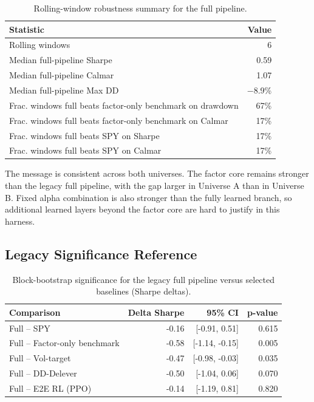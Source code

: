 \documentclass[10pt,twocolumn]{article}
\begin{document}
\begin{table}[t]
\centering
\caption{Rolling-window robustness summary for the full pipeline.}
\label{tab:robustness_summary}
\begingroup\small
\begin{tabular}{@{} >{\raggedright\arraybackslash}p{} r @{}}
\toprule
\textbf{Statistic} & \textbf{Value} \\
\midrule
Rolling windows                                    & 6 \\
Median full-pipeline Sharpe                        & 0.59 \\
Median full-pipeline Calmar                        & 1.07 \\
Median full-pipeline Max DD                        & $-$8.9\% \\
Frac. windows full beats factor-only benchmark on drawdown & 67\% \\
Frac. windows full beats factor-only benchmark on Calmar   & 17\% \\
Frac. windows full beats SPY on Sharpe             & 17\% \\
Frac. windows full beats SPY on Calmar             & 17\% \\
\bottomrule
\end{tabular}
\endgroup
\end{table}

The message is consistent across both universes. The factor core remains
stronger than the legacy full pipeline, with the gap larger in Universe A than
in Universe B. Fixed alpha combination is also stronger than the fully learned
branch, so additional learned layers beyond the factor core are hard to
justify in this harness.

\subsection{Legacy Significance Reference}

\begin{table}[t]
\centering
\caption{Block-bootstrap significance for the legacy full pipeline versus
selected baselines (Sharpe deltas).}
\label{tab:legacy_bootstrap_significance}
\small
\begin{tabular}{@{} p{} r r r @{}}
\toprule
\textbf{Comparison} & \textbf{Delta Sharpe} & \textbf{95\% CI} & \textbf{p-value} \\
\midrule
Full -- SPY                   & -0.16 & [-0.91, 0.51] & 0.615 \\
Full -- Factor-only benchmark & -0.58 & [-1.14, -0.15] & 0.005 \\
Full -- Vol-target            & -0.47 & [-0.98, -0.03] & 0.035 \\
Full -- DD-Delever            & -0.50 & [-1.04, 0.06] & 0.070 \\
Full -- E2E RL (PPO)          & -0.14 & [-1.19, 0.81] & 0.820 \\
\bottomrule
\end{tabular}
\end{table}
\end{document}
